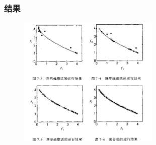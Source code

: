 \documentclass{beamer}
\begin{document}
\begin{frame}
	\frametitle{结果}
\begin{figure}[htbp]
	\centering
	\includegraphics[width=0.6\textwidth]{计算结果.jpg}
\end{figure}
\end{frame}
\end{document}
